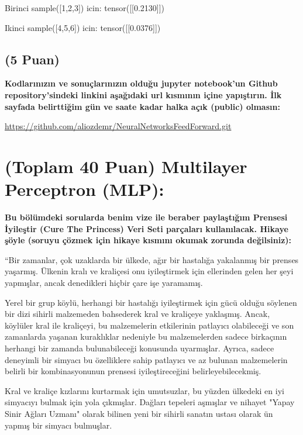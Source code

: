 \documentclass[11pt]{article}
\begin{document}
\item Birinci sample([1,2,3]) icin: tensor([[0.2130]]) 
 \item Ikinci  sample([4,5,6]) icin: tensor([[0.0376]])
​

\subsection{(5 Puan)} \textbf{Kodlarınızın ve sonuçlarınızın olduğu jupyter notebook'un Github repository'sindeki linkini aşağıdaki url kısmının içine yapıştırın. İlk sayfada belirttiğim gün ve saate kadar halka açık (public) olmasın:}

\url{https://github.com/aliozdemr/NeuralNetworksFeedForward.git}

\section{(Toplam 40 Puan) Multilayer Perceptron (MLP):} 
\textbf{Bu bölümdeki sorularda benim vize ile beraber paylaştığım Prensesi İyileştir (Cure The Princess) Veri Seti parçaları kullanılacak. Hikaye şöyle (soruyu çözmek için hikaye kısmını okumak zorunda değilsiniz):} 

``Bir zamanlar, çok uzaklarda bir ülkede, ağır bir hastalığa yakalanmış bir prenses yaşarmış. Ülkenin kralı ve kraliçesi onu iyileştirmek için ellerinden gelen her şeyi yapmışlar, ancak denedikleri hiçbir çare işe yaramamış.

Yerel bir grup köylü, herhangi bir hastalığı iyileştirmek için gücü olduğu söylenen bir dizi sihirli malzemeden bahsederek kral ve kraliçeye yaklaşmış. Ancak, köylüler kral ile kraliçeyi, bu malzemelerin etkilerinin patlayıcı olabileceği ve son zamanlarda yaşanan kuraklıklar nedeniyle bu malzemelerden sadece birkaçının herhangi bir zamanda bulunabileceği konusunda uyarmışlar. Ayrıca, sadece deneyimli bir simyacı bu özelliklere sahip patlayıcı ve az bulunan malzemelerin belirli bir kombinasyonunun prensesi iyileştireceğini belirleyebilecekmiş.

Kral ve kraliçe kızlarını kurtarmak için umutsuzlar, bu yüzden ülkedeki en iyi simyacıyı bulmak için yola çıkmışlar. Dağları tepeleri aşmışlar ve nihayet "Yapay Sinir Ağları Uzmanı" olarak bilinen yeni bir sihirli sanatın ustası olarak ün yapmış bir simyacı bulmuşlar.
\end{document}
